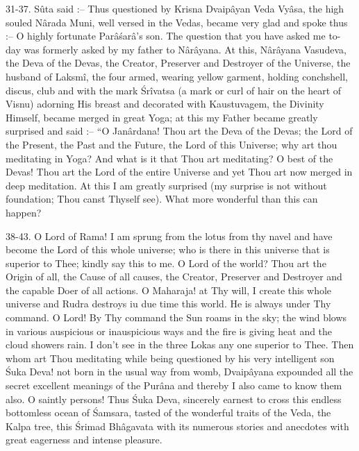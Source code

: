 31-37. S\^uta said :-- Thus questioned by Krisna Dvaip\^ayan Veda Vy\^asa, the high souled N\^arada Muni, well versed in the Vedas, became very glad and spoke thus :-- O highly fortunate Par\^a\'sar\^a’s son. The question that you have asked me to-day was formerly asked by my father to N\^ar\^ayana. At this, N\^ar\^ayana Vasudeva, the Deva of the Devas, the Creator, Preserver and Destroyer of the Universe, the husband of Laksm\^i, the four armed, wearing yellow garment, holding conchshell, discus, club and with the mark \'Sr\^ivatsa (a mark or curl of hair on the heart of Visnu) adorning His breast and decorated with  Kaustuvagem, the Divinity Himself, became merged in great Yoga; at this my Father became greatly surprised and said :-- ``O Jan\^ardana! Thou art the Deva of the Devas; the Lord of the Present, the Past and the Future, the Lord of this Universe; why art thou meditating in Yoga? And what is it that Thou art meditating? O best of the Devas! Thou art the Lord of the entire Universe and yet Thou art now merged in deep meditation. At this I am greatly surprised (my surprise is not without foundation; Thou canst Thyself see). What more wonderful than this can happen?

38-43. O Lord of Rama! I am sprung from the lotus from thy navel and have become the Lord of this whole universe; who is there in this universe that is superior to Thee; kindly say this to me. O Lord of the world? Thou art the Origin of all, the Cause of all causes, the Creator, Preserver and Destroyer and the capable Doer of all actions. O Maharaja! at Thy will, I create this whole universe and Rudra destroys iu due time this world. He is always under Thy command. O Lord! By Thy command the Sun roams in the sky; the wind blows in various auspicious or inauspicious ways and the fire is giving heat and the cloud showers rain. I don’t see in the three Lokas any one superior to Thee. Then whom art Thou meditating while being questioned by his very intelligent son \'Suka Deva! not born in the usual way from womb, Dvaip\^ayana expounded all the secret excellent meanings of the Pur\^ana and thereby I also came to know them also. O saintly persons! Thus \'Suka Deva, sincerely earnest to cross this endless bottomless ocean of \'Samsara, tasted of the wonderful traits of the Veda, the Kalpa tree, this \'Srimad Bh\^agavata with its numerous stories and anecdotes with great eagerness and intense pleasure.

